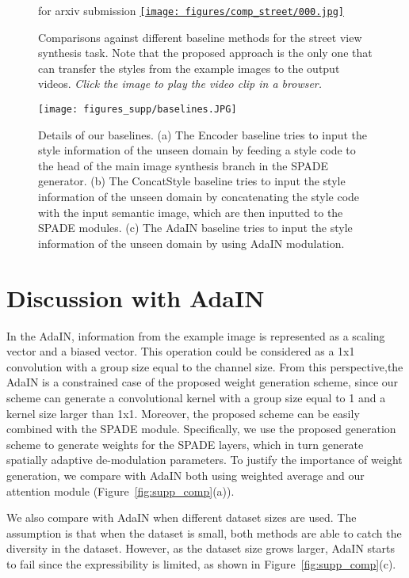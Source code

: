\documentclass{article}
\def\arxiv{for arxiv submission}
\newcommand{\acrobat}{\emph{Click the image to play the video clip in a browser.}}
\newcommand{\acrobat}{\emph{The figure is best viewed with Acrobat Reader. Click the image to play the video clip.}}
\begin{document}
\begin{figure}[b!]
 \centering
 \ifdefined\arxiv
 \href{https://nvlabs.github.io/few-shot-vid2vid/web_gifs/comp_street.mp4}{\texttt{[image: figures/comp\_street/000.jpg]}}
 \else
 \fi
  \caption{Comparisons against different baseline methods for the street view synthesis task. Note that the proposed approach is the only one that can transfer the styles from the example images to the output videos. \acrobat}
 \label{fig::comp_street}
 \vspace{-2mm}
\end{figure} \begin{figure}[t!]
 \texttt{[image: figures\_supp/baselines.JPG]}
 \vspace{-2mm}
  \caption{Details of our baselines. (a) The Encoder baseline tries to input the style information of the unseen domain by feeding a style code to the head of the main image synthesis branch in the SPADE generator. (b) The ConcatStyle baseline tries to input the style information of the unseen domain by concatenating the style code with the input semantic image, which are then inputted to the SPADE modules. (c) The AdaIN baseline tries to input the style information of the unseen domain by using AdaIN modulation.}
 \label{fig::supp_encoder}
\end{figure} 
\section{Discussion with AdaIN} In the AdaIN, information from the example image is represented as a scaling vector and a biased vector. This operation could be considered as a 1x1 convolution with a group size equal to the channel size. From this perspective,the  AdaIN is a constrained case of the proposed weight generation scheme, since our scheme can generate a convolutional kernel with a group size equal to 1 and a kernel size larger than 1x1. Moreover, the proposed scheme can be easily combined with the SPADE module. Specifically, we use the proposed generation scheme to generate weights for the SPADE layers, which in turn generate spatially adaptive de-modulation parameters. To justify the importance of weight generation, we compare with AdaIN both using weighted average and our attention module (Figure~\ref{fig:supp_comp}(a)). 

We also compare with AdaIN when different dataset sizes are used. The assumption is that when the dataset is small, both methods are able to catch the diversity in the dataset. However, as the dataset size grows larger, AdaIN starts to fail since the expressibility is limited, as shown in Figure~\ref{fig:supp_comp}(c). 
\end{document}
